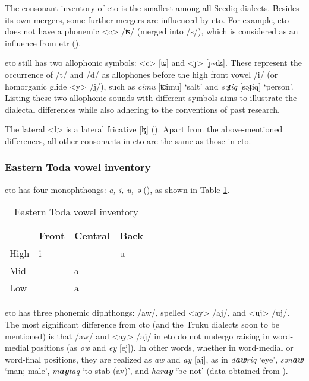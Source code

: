 The consonant inventory of \acl{eto} is the smallest among all Seediq dialects. Besides its own mergers, some further mergers are influenced by \acl{eto}. For example, \acl{eto} does not have a phonemic <c> /ʦ/ (merged into /s/), which is considered as an influence from \acl{etr} (\cite{lee2015tawsa}). 

\acl{eto} still has two allophonic symbols: <c> [ʨ] and <ɟ> [ɟ\~{ }ʥ]. These represent the occurrence of /t/ and /d/ as allophones before the high front vowel /i/ (or homorganic glide <y> /j/), such as \textit{cimu} [ʨimu] `salt' and \textit{səɟiq} [səɟiq] `person'. Listing these two allophonic sounds with different symbols aims to illustrate the dialectal differences while also adhering to the conventions of past research.

The lateral <l> is a lateral fricative [ɮ] (\cite{lee2012segment,lee2015tawsa}). Apart from the above-mentioned differences, all other consonants in \acl{eto} are the same as those in \acl{cto}.

\subsubsection{Eastern Toda vowel inventory}

\acl{eto} has four monophthongs: \textit{a, i, u, ə} (\cite{lee2012segment,lee2015tawsa}), as shown in Table \ref{tab:etoV}.

\begin{table}[!htbp]
\centering
\caption{Eastern Toda vowel inventory}
\label{tab:etoV}
\begin{tabular}{llll}
\hline
     & Front & Central & Back \\ \hline
High &  i    &         &  u   \\
Mid  &       &  ə      &      \\
Low  &       &  a      &      \\ \hline
\end{tabular}
\end{table}

\acl{eto} has three phonemic diphthongs: /aw/, spelled <ay> /aj/, and <uj> /uj/. The most significant difference from \acl{cto} (and the Truku dialects soon to be mentioned) is that /aw/ and <ay> /aj/ in \acl{eto} do not undergo raising in word-medial positions (as \textit{ow} and \textit{ey} [ej]). In other words, whether in word-medial or word-final positions, they are realized as \textit{aw} and \textit{ay} [aj], as in \textit{d\textbf{aw}riq} `eye', \textit{sən\textbf{aw}} `man; male', \textit{m\textbf{ay}taq} `to stab (\acs{av})', and \textit{har\textbf{ay}} `be not' (data obtained from \cite{lee2015tawsa}).

